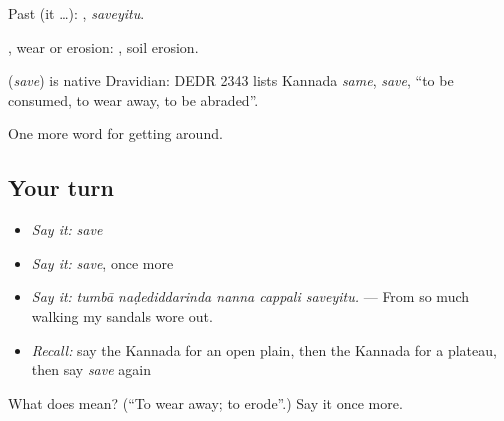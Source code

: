 Past (it …): , \emph{saveyitu}.

, wear or erosion:  , soil erosion.

\begin{cousinweb}
\textbf{} (\emph{save}) is native Dravidian: DEDR 2343 lists Kannada \emph{same}, \emph{save}, \textquotedblleft{}to be consumed, to wear away, to be abraded\textquotedblright{}.
\end{cousinweb}

\begin{grammarlens}[title={What you've built}]
One more word for getting around.
\end{grammarlens}

\subsection*{Your turn}
\begin{itemize}
\raggedright
  \item \emph{Say it:} \emph{save}
  \item \emph{Say it:} \emph{save}, once more
  \item \emph{Say it:} \emph{tumbā naḍediddarinda nanna cappali saveyitu.} — From so much walking my sandals wore out.
  \item \emph{Recall:} say the Kannada for an open plain, then the Kannada for a plateau, then say \emph{save} again
\end{itemize}

\begin{tcolorbox}[breakable,colback=teal!4,colframe=teal!35!black,title={Before you move on}]
What does  mean? (\textquotedblleft{}To wear away; to erode\textquotedblright{}.) Say it once more.
\end{tcolorbox}
